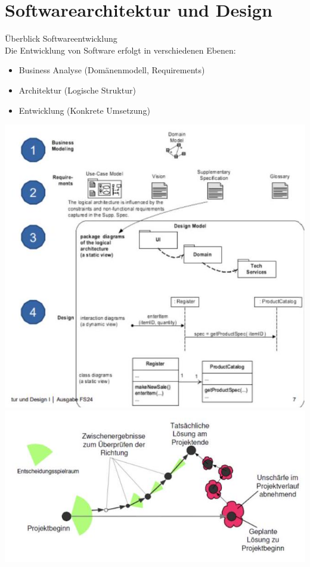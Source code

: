 \section{Softwarearchitektur und Design}

\begin{concept}{Überblick Softwareentwicklung}\\
Die Entwicklung von Software erfolgt in verschiedenen Ebenen:
\begin{itemize}
    \item Business Analyse (Domänenmodell, Requirements)
    \item Architektur (Logische Struktur)
    \item Entwicklung (Konkrete Umsetzung)
\end{itemize}
\includegraphics[width=\linewidth]{images/2024_12_29_0d1d7b5551ea1b4b41bdg-07(2)}
\includegraphics[width=\linewidth]{images/2024_12_29_0d1d7b5551ea1b4b41bdg-08(1)}
\end{concept}


